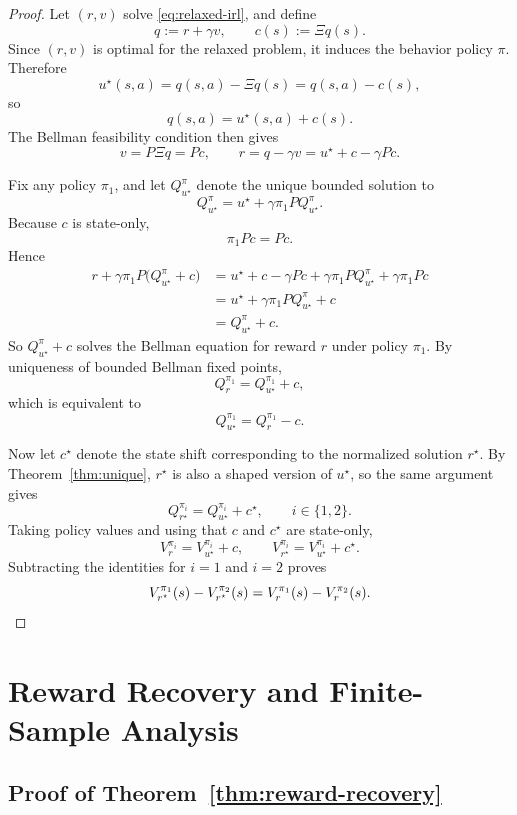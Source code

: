 \begin{proof}
Let \((r,v)\) solve \eqref{eq:relaxed-irl}, and define
\[
q:=r+\gamma v,
\qquad
c(s):=\Xi q(s).
\]
Since \((r,v)\) is optimal for the relaxed problem, it induces the behavior
policy \(\pi\). Therefore
\[
u^\star(s,a)
=
q(s,a)-\Xi q(s)
=
q(s,a)-c(s),
\]
so
\[
q(s,a)=u^\star(s,a)+c(s).
\]
The Bellman feasibility condition then gives
\[
v=P\Xi q=Pc,
\qquad
r=q-\gamma v=u^\star+c-\gamma Pc.
\]

Fix any policy \(\pi_1\), and let \(Q^\pi_{u^\star}\) denote the unique bounded
solution to
\[
Q^\pi_{u^\star}
=
u^\star+\gamma \pi_1 P Q^\pi_{u^\star}.
\]
Because \(c\) is state-only,
\[
\pi_1 P c = Pc.
\]
Hence
\begin{align*}
r+\gamma \pi_1 P\bigl(Q^\pi_{u^\star}+c\bigr)
&=
u^\star+c-\gamma Pc+\gamma \pi_1 P Q^\pi_{u^\star}+\gamma \pi_1 P c \\
&=
u^\star+\gamma \pi_1 P Q^\pi_{u^\star}+c \\
&=
Q^\pi_{u^\star}+c.
\end{align*}
So \(Q^\pi_{u^\star}+c\) solves the Bellman equation for reward \(r\) under
policy \(\pi_1\). By uniqueness of bounded Bellman fixed points,
\[
Q_r^{\pi_1}=Q_{u^\star}^{\pi_1}+c,
\]
which is equivalent to
\[
Q_{u^\star}^{\pi_1}=Q_r^{\pi_1}-c.
\]

Now let \(c^\star\) denote the state shift corresponding to the normalized
solution \(r^\star\). By Theorem~\ref{thm:unique}, \(r^\star\) is also a shaped
version of \(u^\star\), so the same argument gives
\[
Q_{r^\star}^{\pi_i}=Q_{u^\star}^{\pi_i}+c^\star,
\qquad i\in\{1,2\}.
\]
Taking policy values and using that \(c\) and \(c^\star\) are state-only,
\[
V_r^{\pi_i}
=
V_{u^\star}^{\pi_i}+c,
\qquad
V_{r^\star}^{\pi_i}
=
V_{u^\star}^{\pi_i}+c^\star.
\]
Subtracting the identities for \(i=1\) and \(i=2\) proves
\[
V_{r^\star}^{\pi_1}(s)-V_{r^\star}^{\pi_2}(s)
=
V_r^{\pi_1}(s)-V_r^{\pi_2}(s).
\qedhere
\]
\end{proof}

\section{Reward Recovery and Finite-Sample Analysis}
\label{app:recovery}

\subsection{Proof of Theorem~\ref{thm:reward-recovery}}

